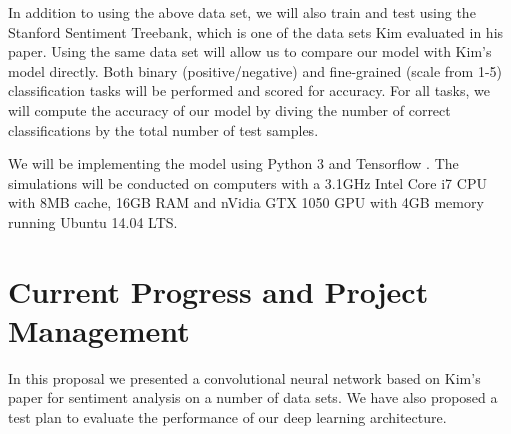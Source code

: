 \documentclass[conference]{IEEEtran}
\begin{document}
    In addition to using the above data set, we will also train and test using the 
    Stanford Sentiment Treebank, which is one of the data sets Kim evaluated in 
    his paper\cite{sentimenttreebank}. Using the same data set
    will allow us to compare our model with Kim's model directly. 
    Both binary (positive/negative) and fine-grained (scale from 1-5) 
    classification tasks will be performed and scored for accuracy.
    For all tasks, we will compute the accuracy of our model by diving the 
    number of correct classifications by the total number of test samples.

    We will be implementing the model using Python 3 and Tensorflow
    \cite{tensorflow2015-whitepaper}. The 
    simulations will be conducted on computers with a 3.1GHz Intel Core i7 
    CPU with 8MB cache, 16GB RAM and nVidia GTX 1050 GPU with 4GB memory 
    running Ubuntu 14.04 LTS.

\section{Current Progress and Project Management}
\label{manage}

    In this proposal we presented a convolutional neural network based on 
    Kim's paper for sentiment analysis on a number of data sets. We have 
    also proposed a test plan to evaluate the performance of our deep 
    learning architecture.



\end{document}
